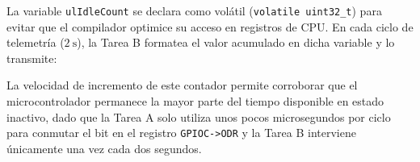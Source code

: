 

La variable \texttt{ulIdleCount} se declara como volátil (\texttt{volatile uint32\_t}) para evitar que el compilador
optimice su acceso en registros de CPU. En cada ciclo de telemetría ($\SI{2}{\second}$), la Tarea B formatea el valor
acumulado en dicha variable y lo transmite:



La velocidad de incremento de este contador permite corroborar que el microcontrolador permanece la mayor parte del
tiempo disponible en estado inactivo, dado que la Tarea A solo utiliza unos pocos microsegundos por ciclo para conmutar
el bit en el registro \texttt{GPIOC->ODR} y la Tarea B interviene únicamente una vez cada dos segundos.
